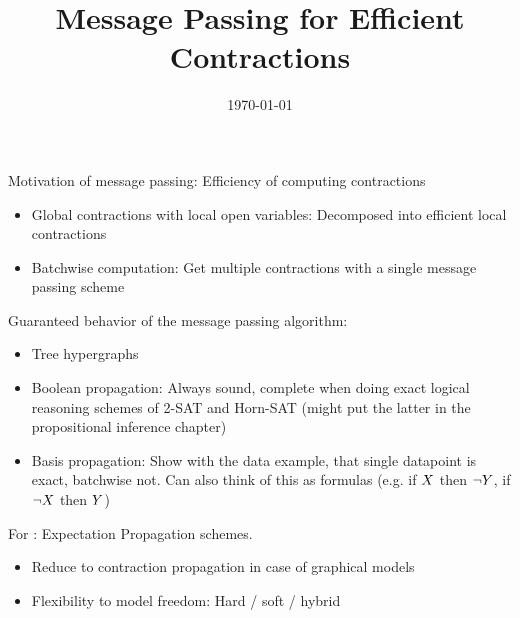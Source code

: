 \documentclass[aps,onecolumn,nofootinbib,pra]{article}
\begin{document}
    \title{Message Passing for Efficient Contractions}

    \maketitle
    \date{\today}

    Motivation of message passing: Efficiency of computing contractions
    \begin{itemize}
        \item Global contractions with local open variables: Decomposed into efficient local contractions
        \item Batchwise computation: Get multiple contractions with a single message passing scheme
    \end{itemize}

    Guaranteed behavior of the message passing algorithm:
    \begin{itemize}
        \item Tree hypergraphs
        \item Boolean propagation: Always sound, complete when doing exact logical reasoning schemes of 2-SAT and Horn-SAT (might put the latter in the propositional inference chapter)
        \item Basis propagation: Show with the data example, that single datapoint is exact, batchwise not. Can also think of this as formulas (e.g. if $X$ then $\lnot Y$, if $\lnot X$ then $Y$)
    \end{itemize}

    For \CompActNets{}:
    Expectation Propagation schemes.
    \begin{itemize}
        \item Reduce to contraction propagation in case of graphical models
        \item Flexibility to model freedom: Hard / soft / hybrid
    \end{itemize}

    

    

    

    

    

    

    
    
\end{document}

